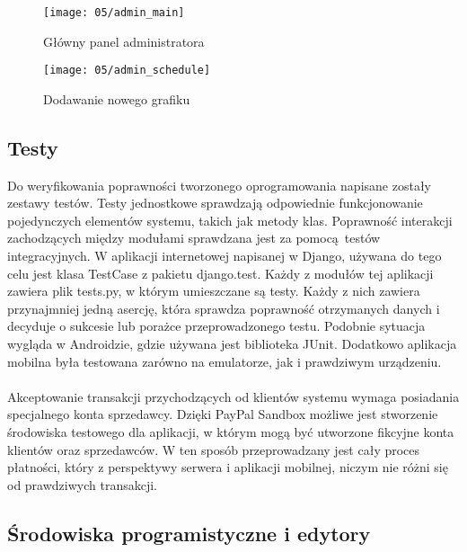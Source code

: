 \newpage

\begin{figure}[p]
	\begin{center}
		\texttt{[image: 05/admin\_main]}
	\end{center}
	\caption{Główny panel administratora}
	\label{serwer_admin}
\end{figure}

\begin{figure}[p]
	\begin{center}
		\texttt{[image: 05/admin\_schedule]}
	\end{center}
	\caption{Dodawanie nowego grafiku}
	\label{serwer_schedule}
\end{figure}

\clearpage

\subsection{Testy}

Do weryfikowania poprawności tworzonego oprogramowania napisane zostały zestawy testów. Testy jednostkowe sprawdzają odpowiednie funkcjonowanie pojedynczych elementów systemu, takich jak metody klas. Poprawność interakcji zachodzących między modułami sprawdzana jest za pomocą testów integracyjnych. W aplikacji internetowej napisanej w Django, używana do tego celu jest klasa TestCase z pakietu django.test. Każdy z modułów tej aplikacji zawiera plik tests.py, w którym umieszczane są testy. Każdy z nich zawiera przynajmniej jedną asercję, która sprawdza poprawność otrzymanych danych i decyduje o sukcesie lub porażce przeprowadzonego testu. Podobnie sytuacja wygląda w Androidzie, gdzie używana jest biblioteka JUnit. Dodatkowo aplikacja mobilna była testowana zarówno na emulatorze, jak i prawdziwym urządzeniu.
\\
\\
Akceptowanie transakcji przychodzących od klientów systemu wymaga posiadania specjalnego konta sprzedawcy. Dzięki PayPal Sandbox możliwe jest stworzenie środowiska testowego dla aplikacji, w którym mogą być utworzone fikcyjne konta klientów oraz sprzedawców. W ten sposób przeprowadzany jest cały proces płatności, który z perspektywy serwera i aplikacji mobilnej, niczym nie różni się od prawdziwych transakcji. 

\subsection{Środowiska programistyczne i edytory}

